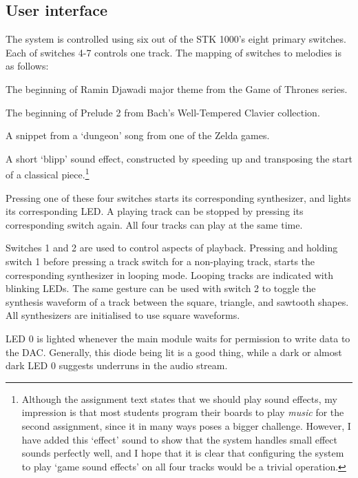 \documentclass[a4paper,9pt]{article}
\begin{document}
\subsection{User interface}
\label{sec:ui}
The system is controlled using six out of the STK 1000's eight primary
switches. Each of switches 4-7 controls one track. The mapping of switches to
melodies is as follows:
\begin{description}
        \footnotesize
    \item[SW7] The beginning of Ramin Djawadi major theme from the Game of
        Thrones series. 
    \item[SW6] The beginning of Prelude 2 from Bach's Well-Tempered Clavier
        collection.
    \item[SW5] A snippet from a `dungeon' song from one of the Zelda
        games.
    \item[SW4] A short `blipp' sound effect, constructed by speeding up and
        transposing the start of a classical piece.\footnote{Although the
        assignment text states that we should play sound effects, my
        impression is that most students program their boards to play
        \emph{music} for the second assignment, since it in many ways poses a
        bigger challenge. However, I have added this `effect' sound to show
        that the system handles small effect sounds perfectly well, and I
        hope that it is clear that configuring the system to play `game sound
        effects' on all four tracks would be a trivial operation.}
\end{description}
Pressing one of these four switches starts its corresponding synthesizer, and
lights its corresponding LED. A playing track can be stopped by pressing its
corresponding switch again. All four tracks can play at the same time.

Switches 1 and 2 are used to control aspects of playback. Pressing and holding
switch 1 before pressing a track switch for a non-playing track, starts the
corresponding synthesizer in looping mode. Looping tracks are indicated with
blinking LEDs. The same gesture can be used with switch 2 to toggle the
synthesis waveform of a track between the square, triangle, and sawtooth
shapes. All synthesizers are initialised to use square waveforms. 

LED 0 is lighted whenever the main module waits for permission to write data
to the DAC. Generally, this diode being lit is a good thing, while a dark or
almost dark LED 0 suggests underruns in the audio stream.
\end{document}
